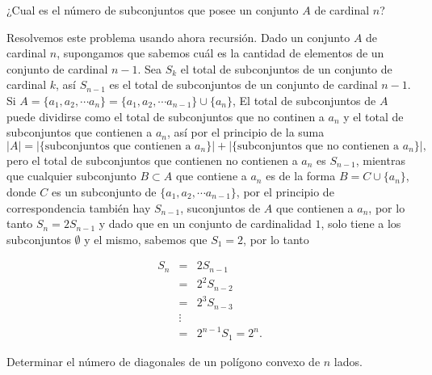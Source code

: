 \begin{ejemplo}
¿Cual es el número de subconjuntos que posee un conjunto $A$ de cardinal $n$?    
\end{ejemplo}

\begin{solucion}
Resolvemos este problema usando ahora recursión. Dado un conjunto $A$ de cardinal $n$, supongamos que sabemos cuál es la cantidad de elementos de un conjunto de cardinal $n-1$. Sea $S_{k}$ el total de subconjuntos de un conjunto de cardinal $k$, así $S_{n-1}$ es el total de subconjuntos de un conjunto de cardinal $n-1$. Si $A=\{a_1, a_2, \cdots a_n \}=\{a_1, a_2, \cdots a_{n-1} \}\cup \{a_n\}$, El total de subconjuntos de $A$ puede dividirse como el total de subconjuntos que no continen a $a_n$ y el total de subconjuntos que contienen a $a_n$, así por el principio de la suma $$|A|=|\{\text{subconjuntos que contienen a}\,\, a_n\}|+|\{\text{subconjuntos que no contienen a}\,\, a_n\}|,$$ pero el total de subconjuntos que contienen no contienen a $a_n$ es $S_{n-1}$, mientras que cualquier subconjunto $B\subset A$ que contiene a $a_n$ es de la forma $B=C\cup \{a_n\}$, donde $C$ es un subconjunto de $\{a_1, a_2, \cdots a_{n-1} \}$, por el principio de correspondencia también hay $S_{n-1}$, suconjuntos de $A$ que contienen a $a_n$, por lo tanto $S_n=2S_{n-1}$ y dado que en un conjunto de cardinalidad $1$, solo tiene a los subconjuntos $\emptyset$ y el mismo, sabemos que $S_1=2$, por lo tanto

\begin{eqnarray*}
    S_{n} & = & 2S_{n-1}\\
    & = & 2^2S_{n-2}\\
    & = & 2^3S_{n-3}\\
    & \vdots & \\
    & = & 2^{n-1}S_1=2^n.
\end{eqnarray*}
\end{solucion}

\begin{ejemplo}
    Determinar el número de diagonales de un polígono convexo de $n$ lados.
\end{ejemplo}

